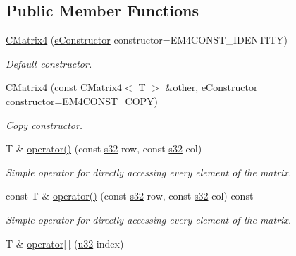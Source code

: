 \subsection*{Public Member Functions}
\begin{DoxyCompactItemize}
\item 
\hyperlink{classirr_1_1core_1_1CMatrix4_af771bfde63cdaa3baa4d9f6121e56411}{C\+Matrix4} (\hyperlink{classirr_1_1core_1_1CMatrix4_a7bb79712227617f706ed57a34f3eb4fe}{e\+Constructor} constructor=E\+M4\+C\+O\+N\+S\+T\+\_\+\+I\+D\+E\+N\+T\+I\+TY)
\begin{DoxyCompactList}\small\item\em Default constructor. \end{DoxyCompactList}\item 
\hyperlink{classirr_1_1core_1_1CMatrix4_acdb7afc2248d97a7e882cd1bdeed07b7}{C\+Matrix4} (const \hyperlink{classirr_1_1core_1_1CMatrix4}{C\+Matrix4}$<$ T $>$ \&other, \hyperlink{classirr_1_1core_1_1CMatrix4_a7bb79712227617f706ed57a34f3eb4fe}{e\+Constructor} constructor=E\+M4\+C\+O\+N\+S\+T\+\_\+\+C\+O\+PY)
\begin{DoxyCompactList}\small\item\em Copy constructor. \end{DoxyCompactList}\item 
T \& \hyperlink{classirr_1_1core_1_1CMatrix4_aaede6824ed3ee05b928815d52e1834d1}{operator()} (const \hyperlink{namespaceirr_ac66849b7a6ed16e30ebede579f9b47c6}{s32} row, const \hyperlink{namespaceirr_ac66849b7a6ed16e30ebede579f9b47c6}{s32} col)\hypertarget{classirr_1_1core_1_1CMatrix4_aaede6824ed3ee05b928815d52e1834d1}{}\label{classirr_1_1core_1_1CMatrix4_aaede6824ed3ee05b928815d52e1834d1}

\begin{DoxyCompactList}\small\item\em Simple operator for directly accessing every element of the matrix. \end{DoxyCompactList}\item 
const T \& \hyperlink{classirr_1_1core_1_1CMatrix4_a370e3a1ed88e95011125d09943b50e3b}{operator()} (const \hyperlink{namespaceirr_ac66849b7a6ed16e30ebede579f9b47c6}{s32} row, const \hyperlink{namespaceirr_ac66849b7a6ed16e30ebede579f9b47c6}{s32} col) const \hypertarget{classirr_1_1core_1_1CMatrix4_a370e3a1ed88e95011125d09943b50e3b}{}\label{classirr_1_1core_1_1CMatrix4_a370e3a1ed88e95011125d09943b50e3b}

\begin{DoxyCompactList}\small\item\em Simple operator for directly accessing every element of the matrix. \end{DoxyCompactList}\item 
T \& \hyperlink{classirr_1_1core_1_1CMatrix4_aead4909f8bb2ab40875af175caf0085f}{operator\mbox{[}$\,$\mbox{]}} (\hyperlink{namespaceirr_a0416a53257075833e7002efd0a18e804}{u32} index)\hypertarget{classirr_1_1core_1_1CMatrix4_aead4909f8bb2ab40875af175caf0085f}{}\label{classirr_1_1core_1_1CMatrix4_aead4909f8bb2ab40875af175caf0085f}


\end{DoxyCompactItemize}
